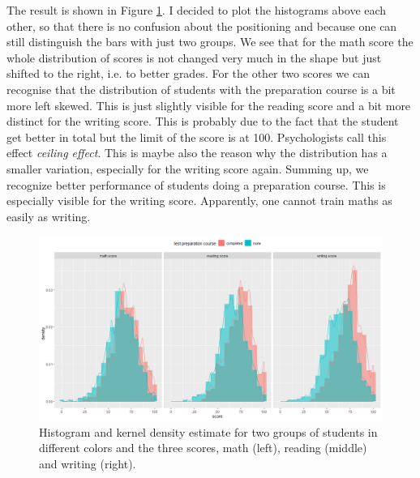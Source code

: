 The result is shown in Figure \ref{6groups}. I decided to plot the histograms above each other, so that there is no confusion about the positioning and because one can still distinguish the bars with just two groups. We see that for the math score the whole distribution of scores is not changed very much in the shape but just shifted to the right, i.e. to better grades. For the other two scores we can recognise that the distribution of students with the preparation course is a bit more left skewed. This is just slightly visible for the reading score and a bit more distinct for the writing score. This is probably due to the fact that the student get better in total but the limit of the score is at 100. Psychologists call this effect \textit{ceiling effect}. This is maybe also the reason why the distribution has a smaller variation, especially for the writing score again. Summing up, we recognize better performance of students doing a preparation course. This is especially visible for the writing score. Apparently, one cannot train maths as easily as writing.
\begin{figure}[!t]
\centering
\includegraphics[width=\textwidth, keepaspectratio]{ex8/groups.png}
\caption{Histogram and kernel density estimate for two groups of students in different colors and the three scores, math (left), reading (middle) and writing (right).}
\label{6groups}
\end{figure} 
